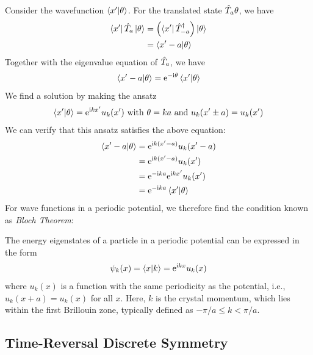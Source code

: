 Consider the wavefunction $\braket{x'|\theta}$. For the translated state $\hat{T}_a \theta$, we have 
\begin{align}
    \bra{x'} \hat{T}_a \ket{\theta} & = \left( \bra{x'} \hat{T}_{-a}^ \dag \right)\ket{\theta} \notag \\
    &= \braket{x'-a|\theta} 
\end{align}
Together with the eigenvalue equation of $\hat{T}_a$, we have
\begin{align}
    \braket{x'-a|\theta} = \mathrm{e}^{- \mathrm{i} \theta} \braket{x'|\theta}
\end{align}
We find a solution by making the ansatz
\begin{align}
    \braket{x'|\theta} = \mathrm{e}^{\mathrm{i} k x'} u_k(x') \text{ with } \theta = k a \text{ and } u_k(x'\pm a) = u_k(x')
\end{align}
We can verify that this ansatz satisfies the above equation: 
\begin{align}
    \braket{x'-a|\theta} &= \mathrm{e}^{\mathrm{i} k (x'-a)} u_k(x'-a) \notag \\
    &= \mathrm{e}^{\mathrm{i} k (x'-a)} u_k(x') \notag \\
    &= \mathrm{e}^{- \mathrm{i} k a} \mathrm{e}^{\mathrm{i} k x'} u_k(x') \notag \\
    &= \mathrm{e}^{- \mathrm{i} k a} \braket{x'|\theta}
\end{align}
For wave functions in a periodic potential, we therefore find the condition known as \emph{Bloch Theorem}: 
\begin{theorem}
    The energy eigenstates of a particle in a periodic potential can be expressed in the form
    \begin{align}
        \psi_k(x) = \braket{x|k} = \mathrm{e}^{\mathrm{i} k x} u_k(x)
    \end{align}
    where $u_k(x)$ is a function with the same periodicity as the potential, i.e., $u_k(x+a) = u_k(x)$ for all $x$. Here, $k$ is the crystal momentum, which lies within the first Brillouin zone, typically defined as $-\pi/a \leq k < \pi/a$.
\end{theorem}




\newpage






\subsection{Time-Reversal Discrete Symmetry}

